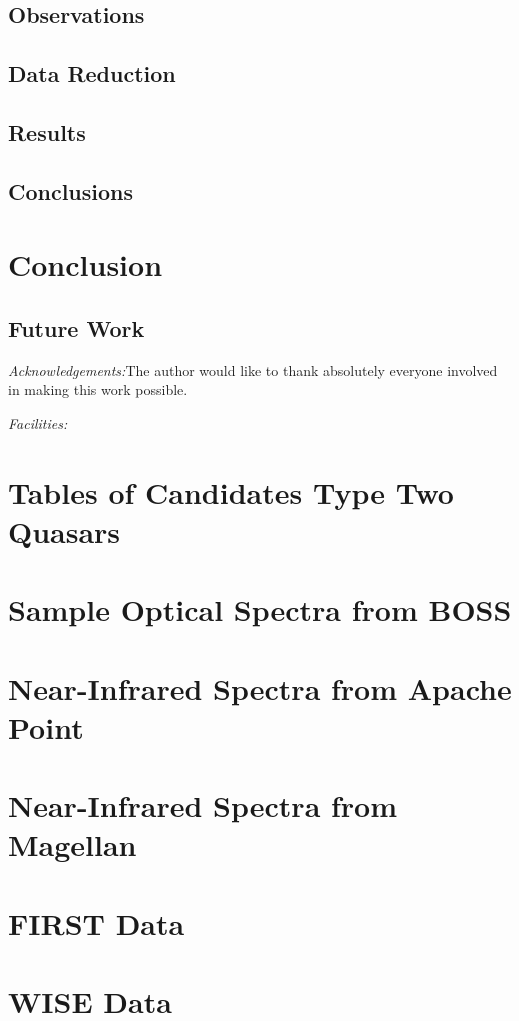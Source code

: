 \documentclass[preprint]{aastex}
\begin{document}
\subsection{Observations}

\subsection{Data Reduction}

\subsection{Results}

\subsection{Conclusions}

\pagebreak

\section{Conclusion}

\subsection{Future Work}

{\it Acknowledgements:}\acknowledgements The author would like to thank absolutely everyone involved in making this work possible.

{\it Facilities:} 

\pagebreak

\appendix

\section{Tables of Candidates Type Two Quasars}

\section{Sample Optical Spectra from BOSS}

\section{Near-Infrared Spectra from Apache Point}

\section{Near-Infrared Spectra from Magellan}

\section{FIRST Data}

\section{WISE Data}

\pagebreak


\end{document}
